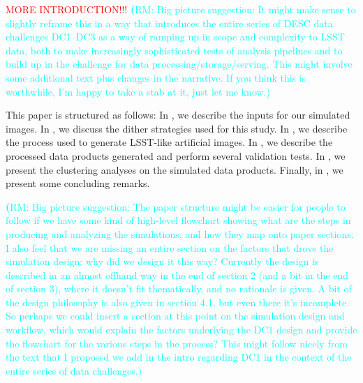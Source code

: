 \documentclass[twocolumn]{aastex62}
\newcommand{\rachel}[1]{{\textcolor{cyan}{{\textbf (RM: #1)}}}}
\begin{document}
\textcolor{red}{MORE INTRODUCTION!!!}
\rachel{Big picture suggestion: It might make sense to slightly reframe this in a way that introduces the entire series of DESC data challenges DC1--DC3 as a way of ramping up in scope and complexity to LSST data, both to make increasingly sophisticated tests of analysis pipelines and to build up in the challenge for data processing/storage/serving.  This might involve some additional text plus changes in the narrative.  If you think this is worthwhile, I'm happy to take a stab at it, just let me know.}

This paper is structured as follows: In , we describe the inputs for our simulated images. In , we discuss the dither strategies used for this study. In , we describe the process used to generate LSST-like artificial images. In , we describe the processed data products generated and perform several validation tests. In , we present the clustering analyses on the simulated data products. Finally, in , we present some concluding remarks.

\rachel{Big picture suggestion: The paper structure might be easier for people to follow if we have some kind of high-level flowchart showing what are the steps in producing and analyzing the simulations, and how they map onto paper sections.  I also feel that we are missing an entire section on the factors that drove the simulation design: why did we design it this way?  Currently the design is described in an almost offhand way in the end of section 2 (and a bit in the end of section 3), where it doesn't fit thematically, and no rationale is given.  A bit of the design philosophy is also given in section 4.1, but even there it's incomplete.  So perhaps we could insert a section at this point on the simulation design and workflow, which would explain the factors underlying the DC1 design and provide the flowchart for the various steps in the process?  This might follow nicely from the text that I proposed we add in the intro regarding DC1 in the context of the entire series of data challenges.}

\end{document}
